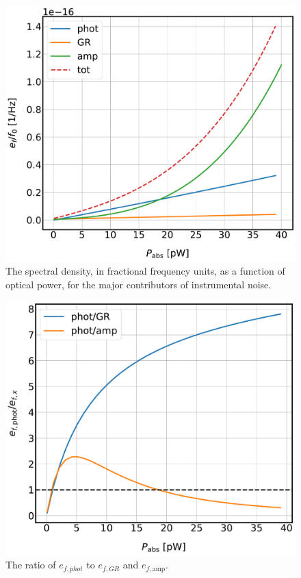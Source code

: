 \begin{figure}[!htbp]
\centering
\includegraphics[width=\textwidth]{figures/kid_model/Sxx_fracfreq}
\caption[The spectral density, in fractional frequency units, as a function of optical power, for the major contributors of instrumental noise.]{The spectral density, in fractional frequency units, as a function of optical power, for the major contributors of instrumental noise.}
\label{fig:Sxx_fracfreq}
\end{figure}

\begin{figure}[!htbp]
\centering
\includegraphics[width=\textwidth]{figures/kid_model/noise_ratios}
\caption[The simulated ratios of photon to GR and photon to amplifier noise.]{The ratio of $e_{f,phot}$ to $e_{f,GR}$ and $e_{f,\mathrm{amp}}$.}
\label{fig:noise_ratios}
\end{figure}

